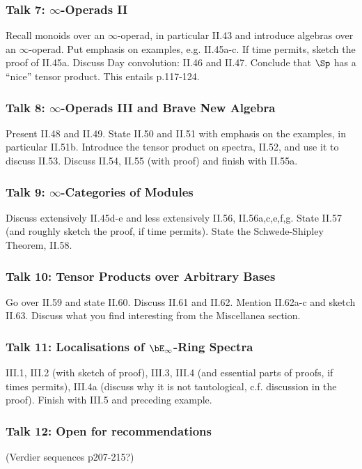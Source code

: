 \documentclass{article}
\begin{document}
\subsubsection*{Talk 7: $\infty$-Operads II}
Recall monoids over an $\infty$-operad, in particular II.43 and 
introduce algebras over an $\infty$-operad.
Put emphasis on examples, e.g. II.45a-c.
If time permits, sketch the proof of II.45a.
Discuss Day convolution: II.46 and II.47.
Conclude that $\Sp$ has a \enquote{nice} tensor product.
This entails p.117-124.

\subsubsection*{Talk 8: $\infty$-Operads III and Brave New Algebra}
Present II.48 and II.49. State II.50 and II.51 with emphasis on 
the examples, in particular II.51b. Introduce the tensor product on
spectra, II.52, and use it to discuss II.53. Discuss II.54, II.55 (with proof)
and finish with II.55a.

\subsubsection*{Talk 9: $\infty$-Categories of Modules}
Discuss extensively II.45d-e and less extensively II.56, II.56a,c,e,f,g.
State II.57 (and roughly sketch the proof, if time permits).
State the Schwede-Shipley Theorem, II.58.

\subsubsection*{Talk 10: Tensor Products over Arbitrary Bases}
Go over II.59 and state II.60. Discuss II.61 and II.62.
Mention II.62a-c and sketch II.63. Discuss what you find interesting
from the Miscellanea section.

\subsubsection*{Talk 11: Localisations of $\bE_\infty$-Ring Spectra}
III.1, III.2 (with sketch of proof), III.3, III.4 (and essential parts
of proofs, if times permits), III.4a (discuss why it is not tautological,
c.f. discussion in the proof). Finish with III.5 and preceding example.

\subsubsection*{Talk 12: Open for recommendations }
(Verdier sequences p207-215?)

\printbibliography
\end{document}
